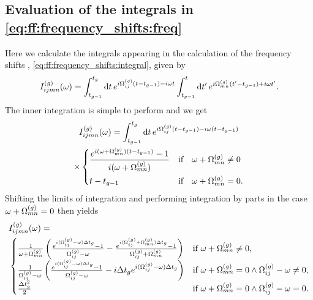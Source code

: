 \subsection{Evaluation of the integrals in \cref{eq:ff:frequency_shifts:freq}}\label{subsec:app:ff:derivations:frequency_shifts:integral}
Here we calculate the integrals appearing in the calculation of the frequency shifts \freqshifts, \cref{eq:ff:frequency_shifts:integral}, given by
\begin{equation}
    I_{ijmn}^{(g)}(\omega) = \int_{t_{g-1}}^{t_g}\dd{t}e^{i\Omega_{ij}^{(g)}(t - t_{g-1}) - i\omega t}
                              \int_{t_{g-1}}^{t}\dd{t^\prime}e^{i\Omega_{mn}^{(g)}(t^\prime - t_{g-1}) + i\omega t^\prime}.
\end{equation}
The inner integration is simple to perform and we get
\begin{multline}
    I_{ijmn}\gth{g}(\omega) = \int_{t_{g-1}}^{t_g}\dd{t}\e^{\i\Omega_{ij}\gth{g}(t - t_{g-1}) - \i\omega(t - t_{g-1})}\\
    \times\begin{dcases}
        \frac{\e^{\i(\omega + \Omega_{mn}\gth{g})(t - t_{g-1})} - 1}{\i(\omega + \Omega_{mn}\gth{g})}   &\qif* \omega + \Omega_{mn}\gth{g}\neq 0 \\
        t - t_{g-1}                                                                                     &\qif* \omega + \Omega_{mn}\gth{g} = 0.
    \end{dcases}
\end{multline}
Shifting the limits of integration and performing integration by parts in the case $\omega + \Omega_{mn}^{(g)} = 0$ then yields
\begin{align}
    &I_{ijmn}^{(g)}(\omega) = \\
    &\begin{cases}
        \frac{1}{\omega + \Omega_{mn}^{(g)}}\left(
            \frac{e^{i(\Omega_{ij}^{(g)} - \omega)\Delta t_g} - 1}{\Omega_{ij}^{(g)} - \omega} -
            \frac{e^{i(\Omega_{ij}^{(g)} + \Omega_{mn}^{(g)})\Delta t_g} - 1}{\Omega_{ij}^{(g)} + \Omega_{mn}^{(g)}}
        \right) &\text{if } \omega + \Omega_{mn}^{(g)}\neq 0, \\
        \frac{1}{\Omega_{ij}^{(g)} - \omega}\left(
            \frac{e^{i(\Omega_{ij}^{(g)} - \omega)\Delta t_g} - 1}{\Omega_{ij}^{(g)} - \omega} -
            i\Delta t_ge^{i(\Omega_{ij}^{(g)} - \omega)\Delta t_g}
        \right) &\text{if } \omega + \Omega_{mn}^{(g)} = 0 \wedge \Omega_{ij}^{(g)} - \omega\neq 0, \\
        \frac{\Delta t_g^2}{2} &\text{if } \omega + \Omega_{mn}^{(g)} = 0 \wedge \Omega_{ij}^{(g)} - \omega = 0.
    \end{cases} \notag
\end{align}

